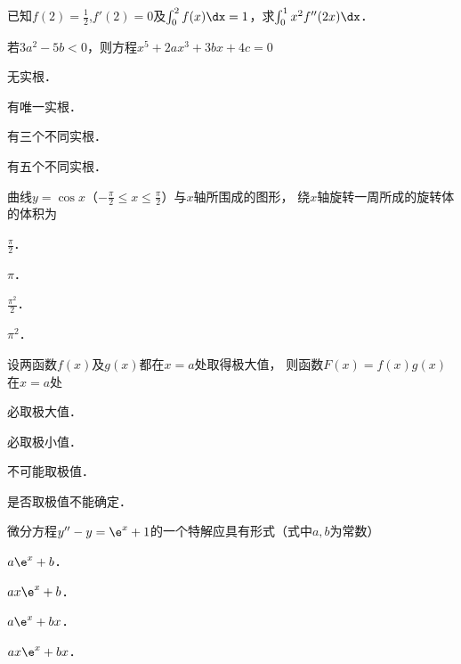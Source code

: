 \documentclass[plain,noanswer,medmath]{../../template/jnuexam}
\begin{document}
\begin{problem}
已知$f(2)=\frac{1}{2}$,$f'(2)=0$及$\int_0^2f(x)\dx=1$，求$\int_0^1x^2f''(2x)\dx$．
\end{problem}






\begin{problem}
若$3a^2-5b<0$，则方程$x^5+2ax^3+3bx+4c=0$ \pickout{}
\begin{abcd}
\item 无实根．
\item 有唯一实根．
\item 有三个不同实根．
\item 有五个不同实根．
\end{abcd}
\end{problem}


\begin{problem}
曲线$y=\cos x$（$-\frac{\pi}{2}\le x\le \frac{\pi}{2}$）与$x$轴所围成的图形，
绕$x$轴旋转一周所成的旋转体的体积为 \pickout{}
\begin{abcd}
\item $\frac{\pi}{2}$．
\item $\pi$．
\item $\frac{\pi^2}{2}$．
\item $\pi^2$．
\end{abcd}
\end{problem}


\begin{problem}
设两函数$f(x)$及$g(x)$都在$x=a$处取得极大值，
则函数$F(x)=f(x)g(x)$在$x=a$处 \pickout{}
\begin{abcd}
\item 必取极大值．
\item 必取极小值．
\item 不可能取极值．
\item 是否取极值不能确定．
\end{abcd}
\end{problem}


\begin{problem}
微分方程$y''-y=\e^x+1$的一个特解应具有形式（式中$a,b$为常数） \pickout{}
\begin{abcd}
\item $a\e^x+b$．
\item $ax\e^x+b$．
\item $a\e^x+bx$．
\item $ax\e^x+bx$．
\end{abcd}
\end{problem}
\end{document}
